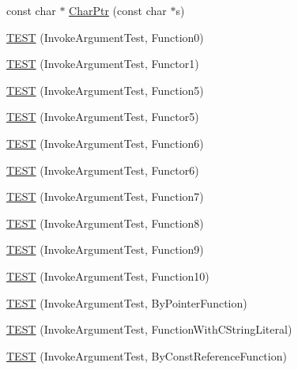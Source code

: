 \begin{DoxyCompactItemize}
\item 
const char $\ast$ \hyperlink{namespacetesting_1_1gmock__generated__actions__test_aa0f16da563ba1f4dd15c8a4fd9048fd3}{Char\+Ptr} (const char $\ast$s)
\item 
\hyperlink{namespacetesting_1_1gmock__generated__actions__test_aee4ab8d88ec59a7e3b91d919a6ed34da}{T\+E\+ST} (Invoke\+Argument\+Test, Function0)
\item 
\hyperlink{namespacetesting_1_1gmock__generated__actions__test_a47d12c8e504971d1f1c17df8d90bff82}{T\+E\+ST} (Invoke\+Argument\+Test, Functor1)
\item 
\hyperlink{namespacetesting_1_1gmock__generated__actions__test_a6afe3cf31ef3f5a9d6fd6af05c9de95c}{T\+E\+ST} (Invoke\+Argument\+Test, Function5)
\item 
\hyperlink{namespacetesting_1_1gmock__generated__actions__test_aab59917791fb297d6735d46e9a862be1}{T\+E\+ST} (Invoke\+Argument\+Test, Functor5)
\item 
\hyperlink{namespacetesting_1_1gmock__generated__actions__test_ae3f8bdac5c2ea1cf56ff1484ebb9a44e}{T\+E\+ST} (Invoke\+Argument\+Test, Function6)
\item 
\hyperlink{namespacetesting_1_1gmock__generated__actions__test_a789c7e8ee88243dc4a53841f6a8da3c6}{T\+E\+ST} (Invoke\+Argument\+Test, Functor6)
\item 
\hyperlink{namespacetesting_1_1gmock__generated__actions__test_a3e13c2ccf384c80c66116418e1b3ccde}{T\+E\+ST} (Invoke\+Argument\+Test, Function7)
\item 
\hyperlink{namespacetesting_1_1gmock__generated__actions__test_a5d583a32b46a306139d32ea9a1d575a9}{T\+E\+ST} (Invoke\+Argument\+Test, Function8)
\item 
\hyperlink{namespacetesting_1_1gmock__generated__actions__test_a3a278f02e1633feda3dea30d810a49ea}{T\+E\+ST} (Invoke\+Argument\+Test, Function9)
\item 
\hyperlink{namespacetesting_1_1gmock__generated__actions__test_afe4653b181e199417b004c4485152010}{T\+E\+ST} (Invoke\+Argument\+Test, Function10)
\item 
\hyperlink{namespacetesting_1_1gmock__generated__actions__test_ac3ff9db96cb7a664ef44d20eb0a7a71f}{T\+E\+ST} (Invoke\+Argument\+Test, By\+Pointer\+Function)
\item 
\hyperlink{namespacetesting_1_1gmock__generated__actions__test_a698f1a80b7fed18141fd170524908885}{T\+E\+ST} (Invoke\+Argument\+Test, Function\+With\+C\+String\+Literal)
\item 
\hyperlink{namespacetesting_1_1gmock__generated__actions__test_a82aff636cad2f441c584fc8e3c057d56}{T\+E\+ST} (Invoke\+Argument\+Test, By\+Const\+Reference\+Function)

\end{DoxyCompactItemize}
